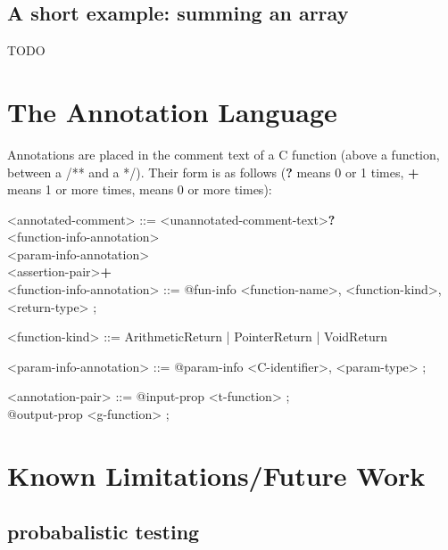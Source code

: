 \documentclass[notitlepage]{article}
\begin{document}
\subsection{A short example: summing an array}

TODO

\section{The Annotation Language}

Annotations are placed in the comment text of a C function (above a function, between a /** and a */). Their form is as follows ({\bf ?} means 0 or 1 times, {\bf +} means 1 or more times, {\bf *} means 0 or more times{\bf}):

\ttfamily

<annotated-comment> ::= <unannotated-comment-text>{\bf ?} \\
\phantom{1}\hspace{120pt}<function-info-annotation> \\
\phantom{1}\hspace{120pt}<param-info-annotation>{\bf *} \\
\phantom{1}\hspace{120pt}<assertion-pair>{\bf +} \\

<function-info-annotation> ::= @fun-info { <function-name>, <function-kind>, <return-type> } ;

<function-kind> ::= ArithmeticReturn | PointerReturn | VoidReturn

<param-info-annotation> ::= @param-info { <C-identifier>, <param-type> } ;

<annotation-pair> ::= @input-prop <t-function>{\bf *} ; \\
\phantom{1}\hspace{110pt}@output-prop <g-function> ;

\rmfamily

\section{Known Limitations/Future Work}

\subsection{probabalistic testing}
\end{document}
